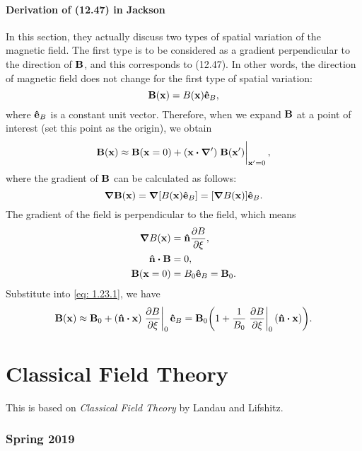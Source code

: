 \documentclass[10pt]{article}
\begin{document}
\subsection{Derivation of (12.47) in Jackson}
In this section, they actually discuss two types of spatial variation of the magnetic field. The first type is to be considered as a gradient perpendicular to the direction of $\vb{B}$, and this corresponds to (12.47). In other words, the direction of magnetic field does not change for the first type of spatial variation:
\begin{equation}
	\vb{B}(\vb{x}) = B(\vb{x}) \vu{e}_B,
\end{equation}
where $\vu{e}_B$ is a constant unit vector.
Therefore, when we expand $\vb{B}$ at a point of interest (set this point as the origin), we obtain
\begin{equation}
	\vb{B}(\vb{x}) \approx \vb{B}(\vb{x} = 0) + (\vb{x} \vdot \grad') \eval{\vb{B}(\vb{x'})}_{\vb{x'} = 0}, \label{eq: 1.23.1}
\end{equation}
where the gradient of $\vb{B}$ can be calculated as follows:
\begin{equation}
	\grad{\vb{B}(\vb{x})} = \grad{[B(\vb{x}) \vu{e}_B]} = [\grad{B(\vb{x})}] \vu{e}_B .
\end{equation}
The gradient of the field is perpendicular to the field, which means
\begin{align}
	\grad{B(\vb{x})} &= \vu{n} \pdv{B}{\xi}, \\
	\vu{n} \vdot \vb{B} &= 0, \\
	\vb{B}(\vb{x} = 0) &= B_0 \vu{e}_B = \vb{B}_0.
\end{align}
Substitute into \eqref{eq: 1.23.1}, we have
\begin{equation}
	\vb{B}(\vb{x}) \approx \vb{B}_0 + (\vu{n} \vdot \vb{x}) \eval{\pdv{B}{\xi}}_0 \vu{e}_B = \vb{B}_0 \qty(1 + \frac{1}{B_0} \eval{\pdv{B}{\xi}}_0 (\vu{n} \vdot \vb{x})).
\end{equation}


\part{Classical Field Theory}
This is based on \textit{Classical Field Theory} by Landau and Lifshitz.
\section{Spring 2019}
\end{document}

